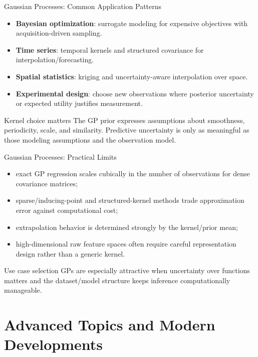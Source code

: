 \documentclass[aspectratio=169,11pt]{beamer}
\begin{document}
\begin{frame}{Gaussian Processes: Common Application Patterns}
\begin{itemize}
  \item \textbf{Bayesian optimization}: surrogate modeling for expensive objectives with acquisition-driven sampling.
  \item \textbf{Time series}: temporal kernels and structured covariance for interpolation/forecasting.
  \item \textbf{Spatial statistics}: kriging and uncertainty-aware interpolation over space.
  \item \textbf{Experimental design}: choose new observations where posterior uncertainty or expected utility justifies measurement.
\end{itemize}

\begin{alertblock}{Kernel choice matters}
The GP prior expresses assumptions about smoothness, periodicity, scale, and similarity. Predictive uncertainty is only as meaningful as those modeling assumptions and the observation model.
\end{alertblock}
\end{frame}

\begin{frame}{Gaussian Processes: Practical Limits}
\begin{itemize}
  \item exact GP regression scales cubically in the number of observations for dense covariance matrices;
  \item sparse/inducing-point and structured-kernel methods trade approximation error against computational cost;
  \item extrapolation behavior is determined strongly by the kernel/prior mean;
  \item high-dimensional raw feature spaces often require careful representation design rather than a generic kernel.
\end{itemize}

\begin{block}{Use case selection}
GPs are especially attractive when uncertainty over functions matters and the dataset/model structure keeps inference computationally manageable.
\end{block}
\end{frame}

\section{Advanced Topics and Modern Developments}
\end{document}
